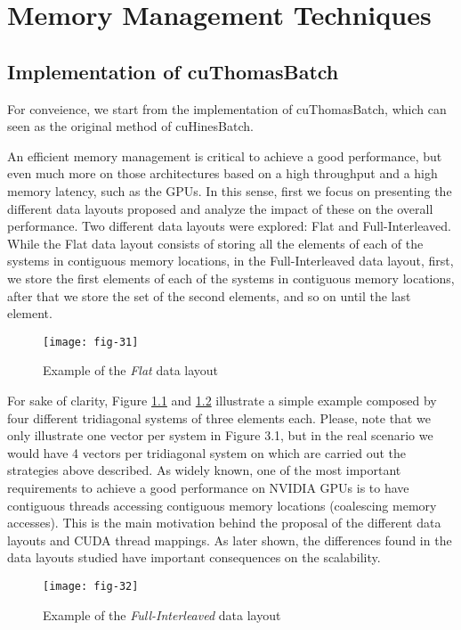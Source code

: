 
\chapter{Memory Management Techniques}

\section{Implementation of cuThomasBatch}
For conveience, we start from the implementation of cuThomasBatch, which can seen as the original method of cuHinesBatch.

An efficient memory management is critical to achieve a good performance, but even
much more on those architectures based on a high throughput and a high memory
latency, such as the GPUs. In this sense, first we focus on presenting the different data
layouts proposed and analyze the impact of these on the overall performance. Two
different data layouts were explored: Flat and Full-Interleaved. While the Flat data
layout consists of storing all the elements of each of the systems in contiguous memory
locations, in the Full-Interleaved data layout, first, we store the first elements of each
of the systems in contiguous memory locations, after that we store the set of the second
elements, and so on until the last element.

\begin{figure}[htbp]
    \centering
    \texttt{[image: fig-31]}
    \caption{Example of the \textit{Flat} data layout}
    \label{fig:fig-31}
\end{figure}

For sake of clarity, Figure \ref{fig:fig-31} and \ref{fig:fig-32} illustrate a simple example composed by four
different tridiagonal systems of three elements each. Please, note that we only illustrate
one vector per system in Figure 3.1, but in the real scenario we would have 4 vectors
per tridiagonal system on which are carried out the strategies above described. As
widely known, one of the most important requirements to achieve a good performance
on NVIDIA GPUs is to have contiguous threads accessing contiguous memory locations
(coalescing memory accesses). This is the main motivation behind the proposal of the
different data layouts and CUDA thread mappings. As later shown, the differences
found in the data layouts studied have important consequences on the scalability.

\begin{figure}[htbp]
    \centering
    \texttt{[image: fig-32]}
    \caption{Example of the \textit{Full-Interleaved} data layout}
    \label{fig:fig-32}
\end{figure}

